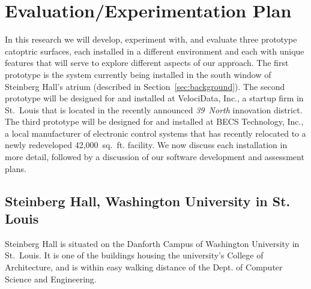 \section{Evaluation/Experimentation Plan}
\label{sec:eval}

In this research we will develop, experiment with, and evaluate three prototype 
catoptric surfaces, each installed in a different environment and each with
unique features that will serve to explore different aspects of our approach.
The first prototype is the system currently being installed in the south window 
of Steinberg Hall's atrium (described in Section~\ref{sec:background}).
The second prototype will be designed for and installed at VelociData, Inc.,
a startup firm in St.~Louis that is located in the recently announced \emph{39~North}
innovation district.
The third prototype will be designed for and installed at BECS Technology, Inc.,
a local manufacturer of electronic control systems that has recently
relocated to a newly redeveloped 42,000~sq.~ft. facility. We now discuss each
installation in more detail, followed by a discussion of our software development
and assessment plans.

\subsection{Steinberg Hall, Washington University in St. Louis}

Steinberg Hall is situated on the Danforth Campus of Washington University
in St.~Louis. It is one of the buildings housing the university's College 
of Architecture, and is within easy walking distance of the Dept. of
Computer Science and Engineering.

